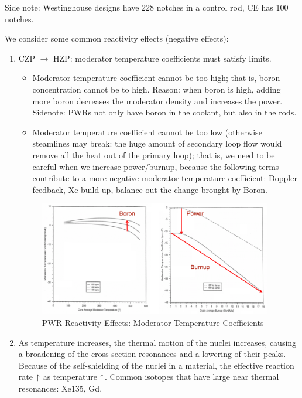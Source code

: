 \documentclass{school-22.211-notes}
\begin{document}
Side note: Westinghouse designs have 228 notches in a control rod, CE has 100 notches. 



\clearpage
{}
We consider some common reactivity effects (negative effects): 
\begin{enumerate}
\item CZP $\to$ HZP: moderator temperature coefficients must satisfy limits.
  \begin{itemize}
  \item Moderator temperature coefficient cannot be too high; that is, boron concentration cannot be to high. Reason: when boron is high, adding more boron decreases the moderator density and increases the power. Sidenote: PWRs not only have boron in the coolant, but also in the rods.
  \item Moderator temperature coefficient cannot be too low (otherwise steamlines may break: the huge amount of secondary loop flow would remove all the heat out of the primary loop); that is, we need to be careful when we increase power/burnup, because the following terms contribute to a more negative moderator temperature coefficient: Doppler feedback, Xe build-up, balance out the change brought by Boron. 
  \end{itemize}
  \begin{figure}[ht]
    \centering
    \includegraphics[width=4in]{images/design/moderator-temp-coeff.png}
    \caption{PWR Reactivity Effects: Moderator Temperature Coefficients} \label{PWR-rho}
  \end{figure}

\item {} As temperature increases, the thermal motion of the nuclei increases, causing a broadening of the cross section resonances and a lowering of their peaks. Because of the self-shielding of the nuclei in a material, the effective reaction rate $\uparrow$ as temperature $\uparrow$. Common isotopes that have large near thermal resonances: Xe135, Gd. 


\end{enumerate}
\end{document}
